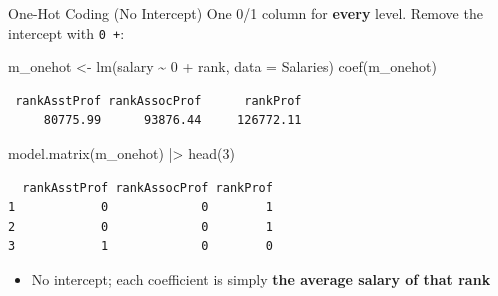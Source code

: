 \documentclass[
  ignorenonframetext,
  aspectratio=169,
]{beamer}
\newenvironment{Shaded}{\begin{snugshade}}{\end{snugshade}}
\newcommand{\AttributeTok}[1]{\textcolor[rgb]{0.40,0.45,0.13}{#1}}
\newcommand{\DecValTok}[1]{\textcolor[rgb]{0.68,0.00,0.00}{#1}}
\newcommand{\FunctionTok}[1]{\textcolor[rgb]{0.28,0.35,0.67}{#1}}
\newcommand{\NormalTok}[1]{\textcolor[rgb]{0.00,0.23,0.31}{#1}}
\newcommand{\OtherTok}[1]{\textcolor[rgb]{0.00,0.23,0.31}{#1}}
\newcommand{\SpecialCharTok}[1]{\textcolor[rgb]{0.37,0.37,0.37}{#1}}
\providecommand{\tightlist}{%
  \setlength{\itemsep}{0pt}\setlength{\parskip}{0pt}}\usepackage{longtable,booktabs,array}
\begin{document}
\begin{frame}[fragile]{One-Hot Coding (No Intercept)}
\protect\hypertarget{sec-onehot}{}
One 0/1 column for \textbf{every} level. Remove the intercept with
\texttt{0\ +}:

\begin{Shaded}
\begin{Highlighting}[]
\NormalTok{m\_onehot }\OtherTok{\textless{}{-}} \FunctionTok{lm}\NormalTok{(salary }\SpecialCharTok{\textasciitilde{}} \DecValTok{0} \SpecialCharTok{+}\NormalTok{ rank, }\AttributeTok{data =}\NormalTok{ Salaries)}
\FunctionTok{coef}\NormalTok{(m\_onehot)}
\end{Highlighting}
\end{Shaded}

\begingroup\tiny\color{darkgray}

\begin{verbatim}
 rankAsstProf rankAssocProf      rankProf 
     80775.99      93876.44     126772.11 
\end{verbatim}

\endgroup

\begin{Shaded}
\begin{Highlighting}[]
\FunctionTok{model.matrix}\NormalTok{(m\_onehot) }\SpecialCharTok{|\textgreater{}} \FunctionTok{head}\NormalTok{(}\DecValTok{3}\NormalTok{)}
\end{Highlighting}
\end{Shaded}

\begingroup\tiny\color{darkgray}

\begin{verbatim}
  rankAsstProf rankAssocProf rankProf
1            0             0        1
2            0             0        1
3            1             0        0
\end{verbatim}

\endgroup

\begin{itemize}
\tightlist
\item
  No intercept; each coefficient is simply \textbf{the average salary of
  that rank}
\end{itemize}
\end{frame}
\end{document}
